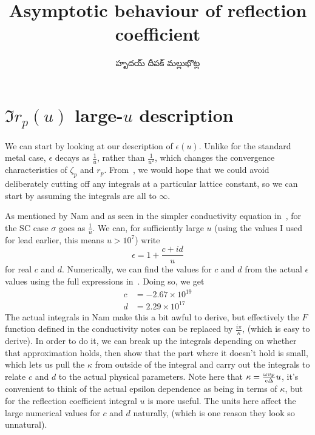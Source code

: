 \documentclass[../main.tex]{subfiles}
\title{Asymptotic behaviour of reflection coefficient}
\author{\begin{telugu}హృదయ్ దీపక్ మల్లుభొట్ల\end{telugu}}
\date{}
\begin{document}
	\onlyinsubfile{\maketitle}

	\section{\texorpdfstring{$\Im r_p(u)$}{imrp} large-\texorpdfstring{$u$}{u} description} \label{sec:imrpasymptotic}

	We can start by looking at our description of $\epsilon(u)$.
	Unlike for the standard metal case, $\epsilon$ decays as $\frac{1}{u}$, rather than $\frac{1}{u^2}$, which changes the convergence characteristics of $\zeta_p$ and $r_p$.
	From~\cite{Churchill2016}, we would hope that we could avoid deliberately cutting off any integrals at a particular lattice constant, so we can start by assuming the integrals are all to $\infty$.

	As mentioned by Nam\cite{Nam1967} and as seen in the simpler conductivity equation in~\cite{AGD}, for the SC case $\sigma$ goes as $\frac1u$.
	We can, for sufficiently large $u$ (using the values I used for lead earlier, this means $u > 10^7$) write
	\begin{equation}
		\epsilon = 1 + \frac{c + i d}{u} \label{eq:epsansatz}
	\end{equation}
	for real $c$ and $d$.
	Numerically, we can find the values for $c$ and $d$ from the actual $\epsilon$ values using the full expressions in~\cite{Nam1967}.
	Doing so, we get
	\begin{align}
		c &= -2.67 \times 10^{19} \\
		d &= 2.29 \times 10^{17}
	\end{align}
	The actual integrals in Nam make this a bit awful to derive, but effectively the $F$ function defined in the conductivity notes can be replaced by $\frac{i \pi}{\kappa}$, (which is easy to derive).
	In order to do it, we can break up the integrals depending on whether that approximation holds, then show that the part where it doesn't hold is small, which lets us pull the $\kappa$ from outside of the integral and carry out the integrals to relate $c$ and $d$ to the actual physical parameters.
	Note here that $\kappa = \frac{\omega v_{\mathrm{F}}}{c \Delta} u$, it's convenient to think of the actual epsilon dependence as being in terms of $\kappa$, but for the reflection coefficient integral $u$ is more useful.
	The units here affect the large numerical values for $c$ and $d$ naturally, (which is one reason they look so unnatural).
\end{document}
